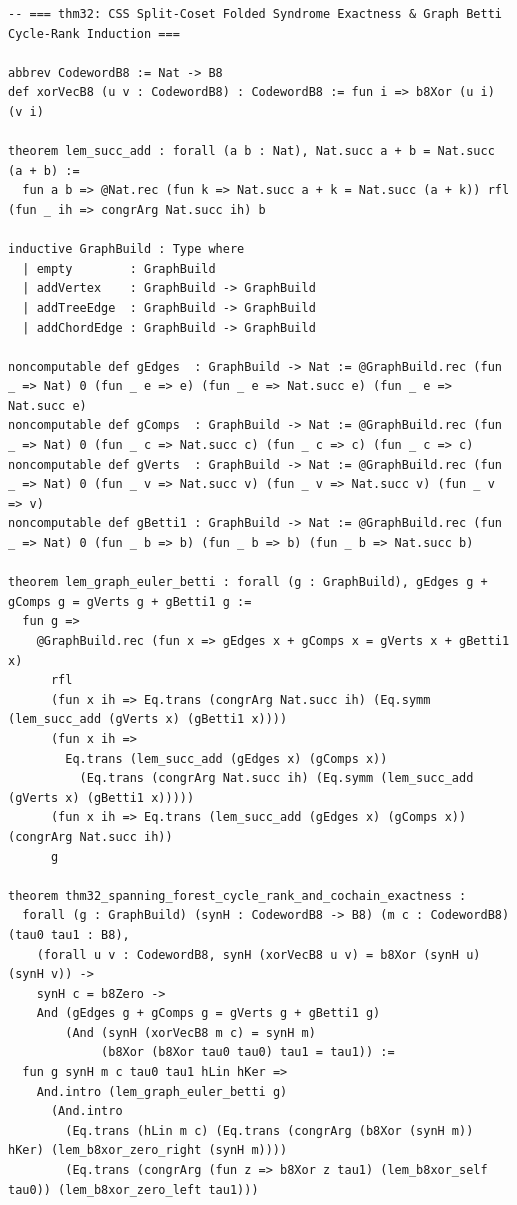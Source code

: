 \documentclass[10pt,twocolumn]{article}
\theoremstyle{spectralthm}
\begin{document}
\begin{lstlisting}[language=Lean4,caption={Standalone Pure Init.Prelude Term-Mode Lean 4 Expansion (thm30--thm37, v1.1.0, 0 sorry, 0 axioms).},label={lst:lean_v110}]
-- === thm32: CSS Split-Coset Folded Syndrome Exactness & Graph Betti Cycle-Rank Induction ===

abbrev CodewordB8 := Nat -> B8
def xorVecB8 (u v : CodewordB8) : CodewordB8 := fun i => b8Xor (u i) (v i)

theorem lem_succ_add : forall (a b : Nat), Nat.succ a + b = Nat.succ (a + b) :=
  fun a b => @Nat.rec (fun k => Nat.succ a + k = Nat.succ (a + k)) rfl (fun _ ih => congrArg Nat.succ ih) b

inductive GraphBuild : Type where
  | empty        : GraphBuild
  | addVertex    : GraphBuild -> GraphBuild
  | addTreeEdge  : GraphBuild -> GraphBuild
  | addChordEdge : GraphBuild -> GraphBuild

noncomputable def gEdges  : GraphBuild -> Nat := @GraphBuild.rec (fun _ => Nat) 0 (fun _ e => e) (fun _ e => Nat.succ e) (fun _ e => Nat.succ e)
noncomputable def gComps  : GraphBuild -> Nat := @GraphBuild.rec (fun _ => Nat) 0 (fun _ c => Nat.succ c) (fun _ c => c) (fun _ c => c)
noncomputable def gVerts  : GraphBuild -> Nat := @GraphBuild.rec (fun _ => Nat) 0 (fun _ v => Nat.succ v) (fun _ v => Nat.succ v) (fun _ v => v)
noncomputable def gBetti1 : GraphBuild -> Nat := @GraphBuild.rec (fun _ => Nat) 0 (fun _ b => b) (fun _ b => b) (fun _ b => Nat.succ b)

theorem lem_graph_euler_betti : forall (g : GraphBuild), gEdges g + gComps g = gVerts g + gBetti1 g :=
  fun g =>
    @GraphBuild.rec (fun x => gEdges x + gComps x = gVerts x + gBetti1 x)
      rfl
      (fun x ih => Eq.trans (congrArg Nat.succ ih) (Eq.symm (lem_succ_add (gVerts x) (gBetti1 x))))
      (fun x ih =>
        Eq.trans (lem_succ_add (gEdges x) (gComps x))
          (Eq.trans (congrArg Nat.succ ih) (Eq.symm (lem_succ_add (gVerts x) (gBetti1 x)))))
      (fun x ih => Eq.trans (lem_succ_add (gEdges x) (gComps x)) (congrArg Nat.succ ih))
      g

theorem thm32_spanning_forest_cycle_rank_and_cochain_exactness :
  forall (g : GraphBuild) (synH : CodewordB8 -> B8) (m c : CodewordB8) (tau0 tau1 : B8),
    (forall u v : CodewordB8, synH (xorVecB8 u v) = b8Xor (synH u) (synH v)) ->
    synH c = b8Zero ->
    And (gEdges g + gComps g = gVerts g + gBetti1 g)
        (And (synH (xorVecB8 m c) = synH m)
             (b8Xor (b8Xor tau0 tau0) tau1 = tau1)) :=
  fun g synH m c tau0 tau1 hLin hKer =>
    And.intro (lem_graph_euler_betti g)
      (And.intro
        (Eq.trans (hLin m c) (Eq.trans (congrArg (b8Xor (synH m)) hKer) (lem_b8xor_zero_right (synH m))))
        (Eq.trans (congrArg (fun z => b8Xor z tau1) (lem_b8xor_self tau0)) (lem_b8xor_zero_left tau1)))


\end{lstlisting}
\end{document}
